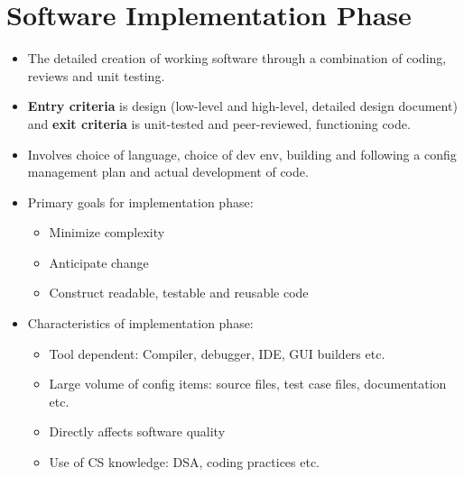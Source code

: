 \documentclass{article}
\begin{document}
\section{Software Implementation Phase}
\begin{itemize}
    \item The detailed creation of working software through a combination of coding, reviews and unit testing.
    
    \item \textbf{Entry criteria} is design (low-level and high-level, detailed design document) and\textbf{ exit criteria} is unit-tested and peer-reviewed, functioning code. 
    
    \item Involves choice of language, choice of dev env, building and following a config management plan and actual development of code. 
    
    \item Primary goals for implementation phase:
    \begin{itemize}
        \item Minimize complexity
        
        \item Anticipate change
        
        \item Construct readable, testable and reusable code
    \end{itemize}
    
    \item Characteristics of implementation phase:
    \begin{itemize}
        \item Tool dependent: Compiler, debugger, IDE, GUI builders etc.
        
        \item Large volume of config items: source files, test case files, documentation etc.
        
        \item Directly affects software quality
        
        \item Use of CS knowledge: DSA, coding practices etc.
    \end{itemize}
\end{itemize}
\end{document}
